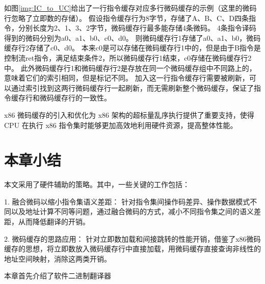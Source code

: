 如图\ref{img:IC_to_UC}给出了一行指令缓存对应多行微码缓存的示例（这里的微码行忽略了立即数的存储）。
假设指令缓存行为8字节，存储了A、B、C、D四条指令，分别长度为2、1、3、2字节，微码缓存行最多能存储4条微码。
4条指令译码得到的微码分别为a0、a1、b0、c0、d0。
则微码缓存行1存储了a0、a1、b0，微码缓存行2存储了c0、d0。
本来c0是可以存储在微码缓存行1中的，但是由于B指令是控制流ret指令，满足结束条件2，所以微码缓存行1结束，c0存储在微码缓存行2中。
此外微码缓存行1和微码缓存行2是存放在同一个微码缓存组中不同路上的，意味着它们的索引相同，但是标记不同。
加入这一行指令缓存行需要被刷新，可以通过索引找到这两行微码缓存行一起刷新，而无需刷新整个微码缓存，保证了指令缓存行和微码缓存行的一致性。

x86 微码缓存的引入和优化为 x86 架构的超标量乱序执行提供了重要支持，使得 CPU 在执行 x86 指令集时能够更加高效地利用硬件资源，提高整体性能。




\section{本章小结}

本文采用了硬件辅助的策略。其中，一些关键的工作包括：

1. 融合微码以缩小指令集语义差距： 针对指令集间操作码差异、操作数据模式不同以及地址计算不同等问题，通过融合微码的方式，减小不同指令集之间的语义差距，从而降低翻译的开销。

2. 微码缓存的思路应用： 针对立即数加载和间接跳转的性能开销，借鉴了x86微码缓存的思想，将立即数放入微码缓存行中直接加载，用微码缓存直接查询非线性的地址空间映射，消除这两类开销。

本章首先介绍了软件二进制翻译器